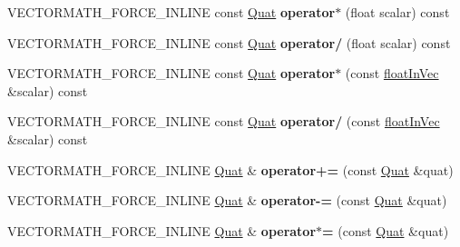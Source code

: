 \begin{DoxyCompactItemize}
V\+E\+C\+T\+O\+R\+M\+A\+T\+H\+\_\+\+F\+O\+R\+C\+E\+\_\+\+I\+N\+L\+I\+NE const \hyperlink{classVectormath_1_1Aos_1_1Quat}{Quat} {\bfseries operator$\ast$} (float scalar) const
\item 
\mbox{\label{classVectormath_1_1Aos_1_1Quat_a92841819b1f1e427dc6b163701c36c26}} 
V\+E\+C\+T\+O\+R\+M\+A\+T\+H\+\_\+\+F\+O\+R\+C\+E\+\_\+\+I\+N\+L\+I\+NE const \hyperlink{classVectormath_1_1Aos_1_1Quat}{Quat} {\bfseries operator/} (float scalar) const
\item 
\mbox{\label{classVectormath_1_1Aos_1_1Quat_a535f9dee238dff47a42f3c67086db36e}} 
V\+E\+C\+T\+O\+R\+M\+A\+T\+H\+\_\+\+F\+O\+R\+C\+E\+\_\+\+I\+N\+L\+I\+NE const \hyperlink{classVectormath_1_1Aos_1_1Quat}{Quat} {\bfseries operator$\ast$} (const \hyperlink{classVectormath_1_1floatInVec}{float\+In\+Vec} \&scalar) const
\item 
\mbox{\label{classVectormath_1_1Aos_1_1Quat_a3929cfe83d2017a0a0228d233901bb82}} 
V\+E\+C\+T\+O\+R\+M\+A\+T\+H\+\_\+\+F\+O\+R\+C\+E\+\_\+\+I\+N\+L\+I\+NE const \hyperlink{classVectormath_1_1Aos_1_1Quat}{Quat} {\bfseries operator/} (const \hyperlink{classVectormath_1_1floatInVec}{float\+In\+Vec} \&scalar) const
\item 
\mbox{\label{classVectormath_1_1Aos_1_1Quat_a9158dc25a79ed436657256b16768ec31}} 
V\+E\+C\+T\+O\+R\+M\+A\+T\+H\+\_\+\+F\+O\+R\+C\+E\+\_\+\+I\+N\+L\+I\+NE \hyperlink{classVectormath_1_1Aos_1_1Quat}{Quat} \& {\bfseries operator+=} (const \hyperlink{classVectormath_1_1Aos_1_1Quat}{Quat} \&quat)
\item 
\mbox{\label{classVectormath_1_1Aos_1_1Quat_a97803eacef896d4cffceda9dc551b43d}} 
V\+E\+C\+T\+O\+R\+M\+A\+T\+H\+\_\+\+F\+O\+R\+C\+E\+\_\+\+I\+N\+L\+I\+NE \hyperlink{classVectormath_1_1Aos_1_1Quat}{Quat} \& {\bfseries operator-\/=} (const \hyperlink{classVectormath_1_1Aos_1_1Quat}{Quat} \&quat)
\item 
\mbox{\label{classVectormath_1_1Aos_1_1Quat_aa3aeb65a6179f1769433b2b1ef3a3586}} 
V\+E\+C\+T\+O\+R\+M\+A\+T\+H\+\_\+\+F\+O\+R\+C\+E\+\_\+\+I\+N\+L\+I\+NE \hyperlink{classVectormath_1_1Aos_1_1Quat}{Quat} \& {\bfseries operator$\ast$=} (const \hyperlink{classVectormath_1_1Aos_1_1Quat}{Quat} \&quat)

\end{DoxyCompactItemize}
